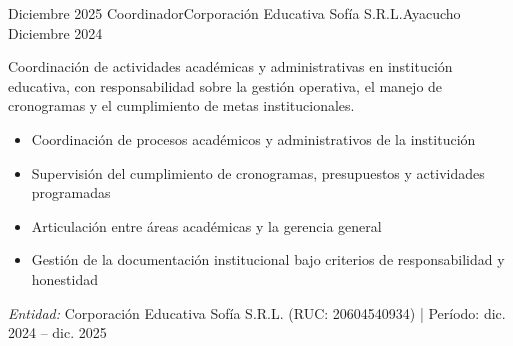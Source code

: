\experience
{Diciembre 2025} {Coordinador}{Corporación Educativa Sofía S.R.L.}{Ayacucho}
{Diciembre 2024} {
	Coordinación de actividades académicas y administrativas en institución educativa, con responsabilidad sobre la gestión operativa, el manejo de cronogramas y el cumplimiento de metas institucionales.
	\begin{itemize}
		\item Coordinación de procesos académicos y administrativos de la institución
		\item Supervisión del cumplimiento de cronogramas, presupuestos y actividades programadas
		\item Articulación entre áreas académicas y la gerencia general
		\item Gestión de la documentación institucional bajo criterios de responsabilidad y honestidad
	\end{itemize}
}
{\footnotesize{\emph{Entidad:} Corporación Educativa Sofía S.R.L. (RUC: 20604540934) | Período: dic. 2024 -- dic. 2025}}

